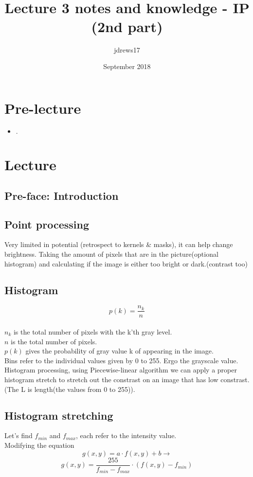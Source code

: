 \documentclass{article}
\title{Lecture 3 notes and knowledge - IP (2nd part)}
\author{jdrews17}
\date{September 2018}
\begin{document}
\maketitle
\newpage

\section{Pre-lecture}
\begin{itemize}
  \item .
\end{itemize}

\section{Lecture}
\subsection{Pre-face: Introduction}

\subsection{Point processing}
Very limited in potential (retrospect to kernels \& masks), it can help change brightness. Taking the amount of pixels that are in the picture(optional histogram) and calculating if the image is either too bright or dark.(contrast too)\\

\subsection{Histogram}
$$p(k) = \frac{n_k}{n}$$\\
$n_k$ is the total number of pixels with the k'th gray level.\\
$n$ is the total number of pixels.\\
$p(k)$ gives the probability of gray value k of appearing in the image.\\
Bins refer to the individual values given by 0 to 255. Ergo the grayscale value.\\
Histogram processing, using Piecewise-linear algorithm we can apply a proper histogram stretch to stretch out the constrast on an image that has low constrast. (The L is length(the values from 0 to 255)).\\

\subsection{Histogram stretching}
Let's find $f_{min}$ and $f_{max}$, each refer to the intensity value.\\
Modifying the equation $$g(x, y) = a \cdot f(x, y) + b \rightarrow$$ $$g(x, y) = \frac{255}{f_{min} - f_{max}} \cdot (f(x, y)- f_{min})$$
\end{document}

